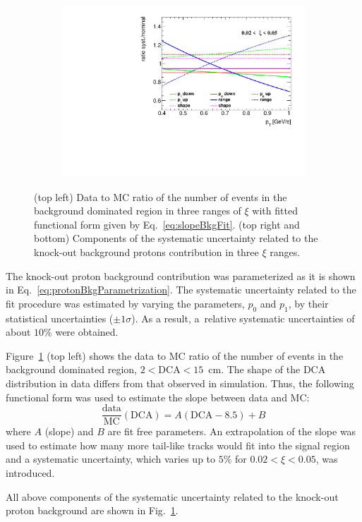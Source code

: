 \begin{figure}[h!]
\begin{subfigure}{.49\textwidth}
 	\end{subfigure}
 	\begin{subfigure}{.49\textwidth}
 		\includegraphics[width=\textwidth,page=3]{chapters/chrgSTAR/img/DCAproton/p_bkg.pdf}
 	\end{subfigure}
 	\caption{(top left) Data to MC ratio of  the  number of events in the background dominated region in three ranges of $\xi$ with fitted functional form given by Eq.~\eqref{eq:slopeBkgFit}. (top right and bottom) Components of the systematic uncertainty related to the  knock-out background protons contribution in three $\xi$ ranges. }
 	\label{fig:protonBkgSyst}
 	
 \end{figure}

The  knock-out proton background contribution was  parameterized as  it is shown in  Eq.~\eqref{eq:protonBkgParametrization}. The systematic uncertainty related to the fit procedure was estimated by varying the   parameters, $p_0$ and $p_1$, by their statistical uncertainties ($\pm1\sigma$).  As a result, a~relative systematic uncertainties of about $10\%$ were obtained.


 
 Figure~\ref{fig:protonBkgSyst} (top left) shows the data to MC ratio of  the  number of events in the background dominated region, $2<\textrm{DCA}<15$~cm. The shape of the $\textrm{DCA}$ distribution in data  differs from that observed in simulation. Thus, the following functional form was used to estimate the slope between data and MC:
\begin{equation}
\frac{\textrm{data}}{\textrm{MC}}\left(\textrm{DCA}\right) = A(\textrm{DCA}-8.5)+B
\label{eq:slopeBkgFit}
\end{equation}
where $A$ (slope) and  $B$ are fit free parameters. An extrapolation of the slope was used to estimate how many
more tail-like tracks would fit into the signal region and a systematic uncertainty, which varies up to $5\%$ for $0.02< \xi<0.05$, was introduced. 




All above components of the systematic uncertainty related to the knock-out proton background are shown in Fig.~\ref{fig:protonBkgSyst}.
 
 
 


 
